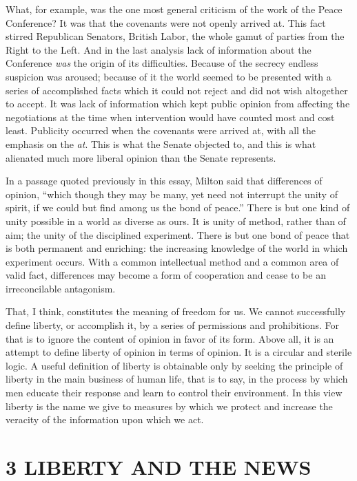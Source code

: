 \documentclass[openany,nobib,twoside,nohyper]{tufte-book}
\let\oldchapter\chapter
\def\chapter{%
  \setcounter{footnote}{0}%
  \oldchapter
}
\begin{document}
What, for example, was the one most general criticism of the work of the
Peace Conference? It was that the covenants were not openly arrived at.
This fact stirred Republican Senators, British Labor, the whole gamut of
parties from the Right to the Left. And in the last analysis lack of
information about the Conference \emph{was} the origin of its
difficulties. Because of the secrecy endless suspicion was aroused;
because of it the world seemed to be presented with a series of
accomplished facts which it could not reject and did not wish altogether
to accept. It was lack of information which kept public opinion from
affecting the negotiations at the time when intervention would have
counted most and cost least. Publicity occurred when the covenants were
arrived at, with all the emphasis on the \emph{at}. This is what the
Senate objected to, and this is what alienated much more liberal opinion
than the Senate represents.

In a passage quoted previously in this essay, Milton said that
differences of opinion, ``which though they may be many, yet need not
interrupt the unity of spirit, if we could but find among us the bond of
peace.'' There is but one kind of unity possible in a world as diverse
as ours. It is unity of method, rather than of aim; the unity of the
disciplined experiment. There is but one bond of peace that is both
permanent and enriching: the increasing knowledge of the world in which
experiment occurs. With a common intellectual method and a common area
of valid fact, differences may become a form of cooperation and cease to
be an irreconcilable antagonism.

That, I think, constitutes the meaning of freedom for us. We cannot
successfully define liberty, or accomplish it, by a series of
permissions and prohibitions. For that is to ignore the content of
opinion in favor of its form. Above all, it is an attempt to define
liberty of opinion in terms of opinion. It is a circular and sterile
logic. A useful definition of liberty is obtainable only by seeking the
principle of liberty in the main business of human life, that is to say,
in the process by which men educate their response and learn to control
their environment. In this view liberty is the name we give to measures
by which we protect and increase the veracity of the information upon
which we act.

\newpage
\thispagestyle{plain} %
\mbox{}

\chapter[3 \hspace*{1mm} LIBERTY AND THE NEWS]{3 LIBERTY AND THE NEWS}
\label{ch:LIBERTY-NEWS}
\end{document}
